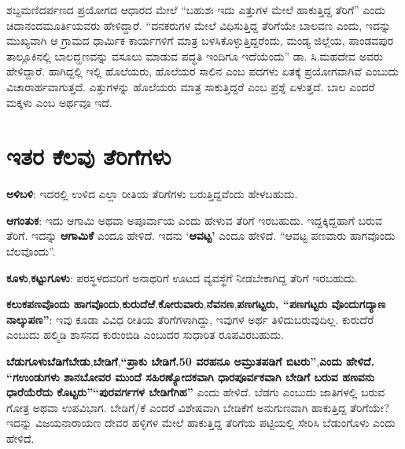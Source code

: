 ಶಬ್ದಮಣಿದರ್ಪಣದ ಪ್ರಯೋಗದ ಆಧಾರದ ಮೇಲೆ “ಬಹುಶಃ ಇದು ಎತ್ತುಗಳ ಮೇಲೆ ಹಾಕುತ್ತಿದ್ದ ತೆರಿಗೆ” ಎಂದು ಚಿದಾನಂದಮೂರ್ತಿಯವರು ಹೇಳಿದ್ದಾರೆ. “ದನಕರುಗಳ ಮೇಲೆ ವಿಧಿಸುತ್ತಿದ್ದ ತೆರಿಗೆಯೇ ಬಾಲವಣ ಎಂದು, ಇದನ್ನು ಮುಖ್ಯವಾಗಿ ಆ ಗ್ರಾಮದ ಧಾರ್ಮಿಕ ಕಾರ್ಯಗಳಿಗೆ ಮಾತ್ರ ಬಳಸಿಕೊಳ್ಳುತ್ತಿದ್ದರೆಂದು, ಮಂಡ್ಯ ಜಿಲ್ಲೆಯ, ಪಾಂಡವಪುರ ತಾಲ್ಲೂಕಿನಲ್ಲಿ ಬಾಲದ್ಹಣವನ್ನು ವಸೂಲು ಮಾಡುವ ಪದ್ಧತಿ ಇಂದಿಗೂ ಇದೆಯೆಂದು” ಡಾ. ಸಿ.ಮಹದೇವ ಅವರು ಹೇಳಿದ್ದಾರೆ. ಹಾಗಿದ್ದಲ್ಲಿ ಇಲ್ಲಿ ಹೊಲೆಯರು, ಹೊಲೆಯರ ಸಾಲಿನ ಎಂಬ ಪದಗಳು ಏತಕ್ಕೆ ಪ್ರಯೋಗವಾಗಿವೆ ಎಂಬುದು ವಿಚಾರಾರ್ಹವಾಗುತ್ತದೆ. ಎತ್ತುಗಳನ್ನು ಹೊಲೆಯರು ಮಾತ್ರ ಸಾಕುತ್ತಿದ್ದರೆ ಎಂಬ ಪ್ರಶ್ನೆ ಏಳುತ್ತದೆ. ಬಾಲ ಎಂದರೆ ಮಕ್ಕಳು ಎಂಬ ಅರ್ಥವೂ ಇದೆ.


\section{ಇತರ ಕೆಲವು ತೆರಿಗೆಗಳು}

\textbf{ಅಳಿಬಳಿ}: ಇದರಲ್ಲಿ ಉಳಿದ ಎಲ್ಲಾ ರೀತಿಯ ತೆರಿಗೆಗಳು ಬರುತ್ತಿದ್ದವೆಂದು ಹೇಳಬಹುದು.

\textbf{ಆಗಂತುಕ}: ಇದು ಆಗಾಮಿ ಅಥವಾ ಅಪೂರ್ವಾಯ ಎಂದು ಹೇಳುವ ತೆರಿಗೆ ಇರಬಹುದು. ಇದ್ದಕ್ಕಿದ್ದಹಾಗೆ ಬರುವ ತೆರಿಗೆ. ಇದನ್ನು \textbf{ಆಗಾಮಿಕೆ} ಎಂದೂ ಹೇಳಿದೆ. ಇದನು ‘\textbf{ಆವಟ್ಟ’ }ಎಂದೂ ಹೇಳಿದೆ. “ಆವಟ್ಟ ಪಣವಾರು ಹಾಗವೊಂದು ಬೆಲವೊಂದು”.

\textbf{ಕೂಳು},\textbf{ಕಟ್ಟುಗೂಳು}: ಪರಸ್ಥಳದವರಿಗೆ ಅನಾಥರಿಗೆ ಊಟದ ವ್ಯವಸ್ಥೆಗೆ ನೀಡಬೇಕಾಗಿದ್ದ ತೆರಿಗೆ ಇರಬಹುದು.

\textbf{ಕಲುಕಪಣವೊಂದು ಹಾಗವೊಂದು},\textbf{ಕುರುದೆಱೆ},\textbf{ಕೋರುವಾರು},\textbf{ನೆವನಣ},\textbf{ಪಣಗಟ್ಟರು, “ಪಣಗಟ್ಟರು ವೊಂದುಗದ್ಯಾಣ ನಾಲ್ಕುಪಣ”}: ಇವು ಕೂಡಾ ವಿವಿಧ ರೀತಿಯ ತೆರಿಗೆಗಳಾಗಿದ್ದು, ಇವುಗಳ ಅರ್ಥ ತಿಳಿದುಬರುವುದಿಲ್ಲ. ಕುರುದೆರೆ ಎಂಬುದು ಹಲ್ಮಿಡಿ ಶಾಸನದ ಕುರುಂಬಿಡಿ ಎಂಬುದರ ಸುಧಾರಿತ ರೂಪವಿರಬಹುದು. 

\textbf{ಬೆಡುಗೂಳು}\textbf{ಬೆಡಿಗೆ}\textbf{ಬೇಡು},\textbf{ಬೇಡಿಗೆ},\textbf{“ಪ್ರಾಕು ಬೇಡಿಗೆ.50 ವರಹನೂ ಅಮ್ರುತಪಡಿಗೆ ಬಿಟರು”},\break \textbf{ಎಂದು ಹೇಳಿದೆ. “ಗಉಂಡುಗಳು ಶಾನಬೋವರ ಮುಂದೆ ಸಹಿರಣ್ಯೋದಕವಾಗಿ ಧಾರಪೂರ್ವಕವಾಗಿ ಬೇಡಿಗೆ ಬರುವ ಹಣವನು ಧಾರೆಯೆರೆದು ಕೊಟ್ಟರು”}\textbf{“ಪುರವರ್ಗಗಳ ಬೇಡಿಗೆಗಿಹ”} ಎಂದು ಹೇಳಿದೆ. ಬೆಡಗು ಎಂಬುದು ಜಾತಿಗಳಲ್ಲಿ ಬರುವ ಗೋತ್ರ ಅಥವಾ ಉಪವಿಭಾಗ. ಬೇಡಿಗೆ/ಕೆ ಎಂದರೆ ವಿಶೇಷವಾಗಿ ಬೇಡಿಕೆಗೆ ಅನುಗುಣವಾಗಿ ಹಾಕುತ್ತಿದ್ದ ತೆರಿಗೆಯೇ? ಇದನ್ನು ವಿಜಯನಾರಾಯಣ ದೇವರ ಹಳ್ಳಿಗಳ ಮೇಲೆ ಹಾಕುತ್ತಿದ್ದ ತೆರಿಗೆಯ ಪಟ್ಟಿಯಲ್ಲಿ ಸೇರಿಸಿ ಬೆಡುಂಗೊಳು ಎಂದು ಹೇಳಿದೆ.

